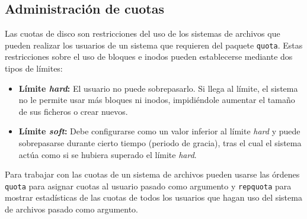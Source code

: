 \subsection{Administración de cuotas}

Las cuotas de disco son restricciones del uso de los sistemas de archivos que pueden realizar los usuarios de un sistema que requieren del paquete \texttt{quota}.
Estas restricciones sobre el uso de bloques e inodos pueden establecerse mediante dos tipos de límites:

\begin{itemize}
	\item\textbf{Límite \emph{hard}:} El usuario no puede sobrepasarlo. Si llega al límite, el sistema no le permite usar más bloques ni inodos, impidiéndole aumentar el tamaño de sus ficheros o crear nuevos.
	\item\textbf{Límite \emph{soft}:} Debe configurarse como un valor inferior al límite \emph{hard} y puede sobrepasarse durante cierto tiempo (periodo de gracia), tras el cual el sistema actúa como si se hubiera superado el límite \emph{hard}.
\end{itemize}

Para trabajar con las cuotas de un sistema de archivos pueden usarse las órdenes \texttt{quota} para asignar cuotas al usuario pasado como argumento y \texttt{repquota} para mostrar estadísticas de las cuotas de todos los usuarios que hagan uso del sistema de archivos pasado como argumento.

